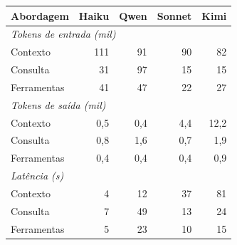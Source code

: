 \begin{tabular}{lrrrr}
\toprule
Abordagem & Haiku & Qwen & Sonnet & Kimi \\
\midrule
\multicolumn{5}{l}{\textit{Tokens de entrada (mil)}} \\
Contexto & 111 & 91 & 90 & 82 \\
Consulta & 31 & 97 & 15 & 15 \\
Ferramentas & 41 & 47 & 22 & 27 \\
\midrule
\multicolumn{5}{l}{\textit{Tokens de saída (mil)}} \\
Contexto & 0,5 & 0,4 & 4,4 & 12,2 \\
Consulta & 0,8 & 1,6 & 0,7 & 1,9 \\
Ferramentas & 0,4 & 0,4 & 0,4 & 0,9 \\
\midrule
\multicolumn{5}{l}{\textit{Latência (s)}} \\
Contexto & 4 & 12 & 37 & 81 \\
Consulta & 7 & 49 & 13 & 24 \\
Ferramentas & 5 & 23 & 10 & 15 \\
\bottomrule
\end{tabular}
